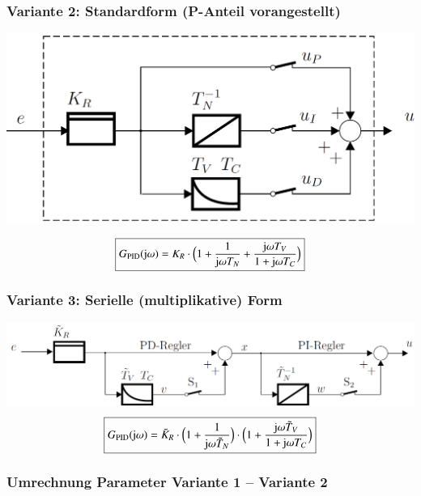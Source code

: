 \subsubsection{Variante 2: Standardform (P-Anteil vorangestellt)}
\label{PID-Regler Standardform}

\begin{minipage}[c]{0.4\columnwidth}
    \includegraphics[width=\columnwidth]{images/pid_regler_aufbau_standardform.png}
\end{minipage}
\hfill
\begin{minipage}[c]{0.55\columnwidth}
    $$ \boxed{ G_{\rm PID}(\mathrm{j} \omega) = K_R \cdot \Big( 1 + \frac{1}{\mathrm{j} \omega T_N} +\frac{\mathrm{j} \omega T_V}{1 + \mathrm{j} \omega T_C} \Big) } $$
\end{minipage}


\subsubsection{Variante 3: Serielle (multiplikative) Form}
\label{PID-Regler multiplikative Form}

    \includegraphics[width=0.8\columnwidth]{images/pid_regler_aufbau_serielle_form.png}
    $$ \boxed{ G_{\rm PID}(\mathrm{j} \omega) = \tilde{K}_R \cdot \Big( 1 + \frac{1}{\mathrm{j} \omega \tilde{T}_N} \Big) \cdot \Big(1 + \frac{\mathrm{j} \omega \tilde{T}_V}{1 + \mathrm{j} \omega T_C} \Big) } $$

\subsubsection{Umrechnung Parameter Variante 1 -- Variante 2}


